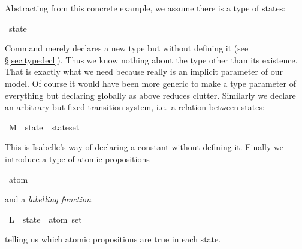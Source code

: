 \begin{isabellebody}
\begin{isamarkuptext}
Abstracting from this concrete example, we assume there is a type of
states:%
\end{isamarkuptext}%
\isamarkuptrue%
\isamarkupfalse%
\ state%
\begin{isamarkuptext}%
\noindent
Command  merely declares a new type but without
defining it (see \S\ref{sec:typedecl}). Thus we know nothing
about the type other than its existence. That is exactly what we need
because  really is an implicit parameter of our model.  Of
course it would have been more generic to make  a type
parameter of everything but declaring  globally as above
reduces clutter.  Similarly we declare an arbitrary but fixed
transition system, i.e.\ a relation between states:%
\end{isamarkuptext}%
\isamarkuptrue%
\isamarkupfalse%
\ M\ {}{}\ {}{}state\ {}\ state{}set{}%
\begin{isamarkuptext}%
\noindent
This is Isabelle's way of declaring a constant without defining it.
Finally we introduce a type of atomic propositions%
\end{isamarkuptext}%
\isamarkuptrue%
\isamarkupfalse%
\ {}atom{}%
\begin{isamarkuptext}%
\noindent
and a \emph{labelling function}%
\end{isamarkuptext}%
\isamarkuptrue%
\isamarkupfalse%
\ L\ {}{}\ {}state\ {}\ atom\ set{}%
\begin{isamarkuptext}%
\noindent
telling us which atomic propositions are true in each state.%
\end{isamarkuptext}%
\isamarkuptrue%
%
\isadelimtheory
%
\endisadelimtheory
%
\isatagtheory
%
\endisatagtheory
{\isafoldtheory}%
%
\isadelimtheory
%
\endisadelimtheory
\end{isabellebody}%
